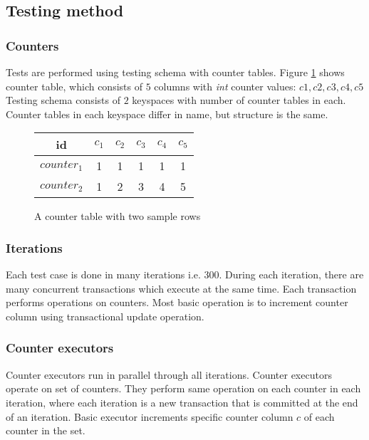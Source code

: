 \subsection{Testing method}

\subsubsection{Counters}
Tests are performed using testing schema with counter tables. Figure \ref{fig:counterTable} shows counter table, which consists of $5$ columns with \emph{int} counter values: $c1,c2,c3,c4,c5$
Testing schema consists of $2$ keyspaces with number of counter tables in each. Counter tables in each keyspace differ in name, but structure is the same.

\begin{figure}[h]
\centering
\begin{tabular}{c||c|c|c|c|c}
        \toprule
        id 		 & $c_{1}$ & $c_{2}$ & $c_{3}$ & $c_{4}$ & $c_{5}$ \\ \midrule
        $counter_{1}$ & 1  & 1  & 1  &  1 & 1  \\
        $counter_{2}$ & 1  & 2  & 3  &  4 & 5  \\ \bottomrule
      \end{tabular}
      \caption{A counter table with two sample rows}
  \label{fig:counterTable}
\end{figure}

\subsubsection{Iterations}
Each test case is done in many iterations i.e. $300$. During each iteration, there are many concurrent transactions which execute at the same time. Each transaction performs operations on counters. Most basic operation is to increment counter column using transactional update operation.

\subsubsection{Counter executors}
Counter executors run in parallel through all iterations. 
Counter executors operate on set of counters. They perform same operation on each counter in each iteration, where each iteration is a new transaction that is committed at the end of an iteration. 
Basic executor increments specific counter column $c$ of each counter in the set.

